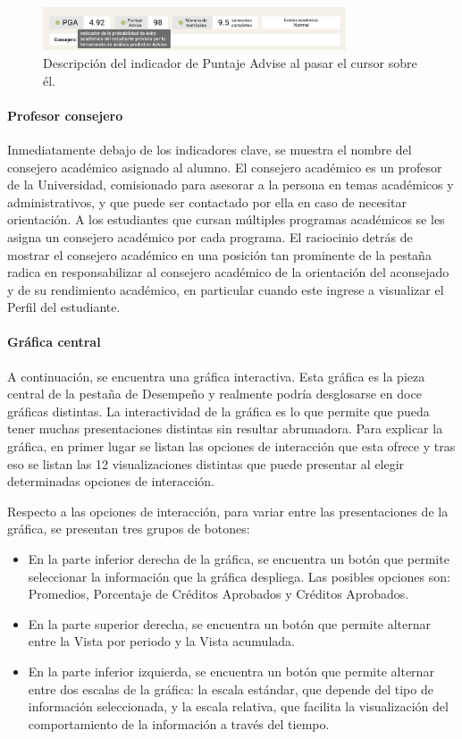 \begin{figure}[H]
  \centering
  \includegraphics[width=0.8\textwidth]{img/nes/indicadores.png}
  \caption{Descripción del indicador de Puntaje Advise al pasar el cursor sobre él.}
  \label{fig:indicadores}
\end{figure}

\paragraph{Profesor consejero} Inmediatamente debajo de los indicadores clave, se muestra el nombre del consejero académico asignado al alumno. El consejero académico es un profesor de la Universidad, comisionado para asesorar a la persona en temas académicos y administrativos, y que puede ser contactado por ella en caso de necesitar orientación. A los estudiantes que cursan múltiples programas académicos se les asigna un consejero académico por cada programa. El raciocinio detrás de mostrar el consejero académico en una posición tan prominente de la pestaña radica en responsabilizar al consejero académico de la orientación del aconsejado y de su rendimiento académico, en particular cuando este ingrese a visualizar el Perfil del estudiante.

\paragraph{Gráfica central} A continuación, se encuentra una gráfica interactiva. Esta gráfica es la pieza central de la pestaña de Desempeño y realmente podría desglosarse en doce gráficas distintas. La interactividad de la gráfica es lo que permite que pueda tener muchas presentaciones distintas sin resultar abrumadora. Para explicar la gráfica, en primer lugar se listan las opciones de interacción que esta ofrece y tras eso se listan las 12 visualizaciones distintas que puede presentar al elegir determinadas opciones de interacción.

Respecto a las opciones de interacción, para variar entre las presentaciones de la gráfica, se presentan tres grupos de botones:
\begin{itemize}
  \item En la parte inferior derecha de la gráfica, se encuentra un botón que permite seleccionar la información que la gráfica despliega. Las posibles opciones son: Promedios, Porcentaje de Créditos Aprobados y Créditos Aprobados.
  \item En la parte superior derecha, se encuentra un botón que permite alternar entre la Vista por periodo y la Vista acumulada.
  \item En la parte inferior izquierda, se encuentra un botón que permite alternar entre dos escalas de la gráfica: la escala estándar, que depende del tipo de información seleccionada, y la escala relativa, que facilita la visualización del comportamiento de la información a través del tiempo.
\end{itemize}

